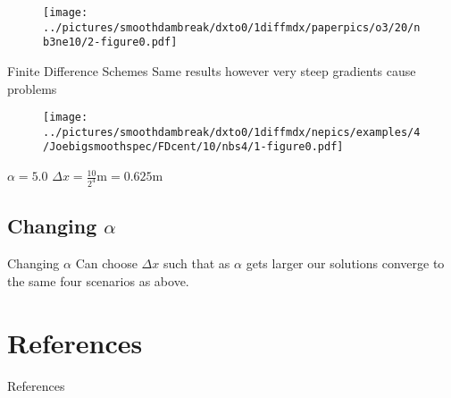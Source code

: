 \documentclass[pdf]{beamer}
\begin{document}
\begin{frame}{}
\begin{figure}
\texttt{[image: ../pictures/smoothdambreak/dxto0/1diffmdx/paperpics/o3/20/nb3ne10/2-figure0.pdf]}
\end{figure}
\end{frame}

\begin{frame}{Finite Difference Schemes}
Same results however very steep gradients cause problems
\begin{figure}
\texttt{[image: ../pictures/smoothdambreak/dxto0/1diffmdx/nepics/examples/4/Joebigsmoothspec/FDcent/10/nbs4/1-figure0.pdf]}
\end{figure}
$\alpha = 5.0$ $\Delta x = \frac{10}{2^4}\text{m} = 0.625\text{m}$
\end{frame}

\subsection{Changing $\alpha$}

\begin{frame}{Changing $\alpha$}
Can choose  $\Delta x$ such that as $\alpha$ gets larger our solutions converge to the same four scenarios as above.
\end{frame}

\section{References}
\begin{frame}[allowframebreaks]{References}


\end{frame}
\end{document}
